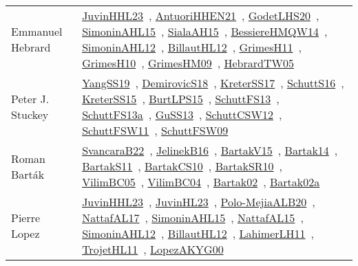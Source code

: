 {\begin{longtable}{p{4cm}p{20cm}}
Emmanuel Hebrard & \href{works/JuvinHHL23.pdf}{JuvinHHL23}~\cite{JuvinHHL23}, \href{works/AntuoriHHEN21.pdf}{AntuoriHHEN21}~\cite{AntuoriHHEN21}, \href{works/GodetLHS20.pdf}{GodetLHS20}~\cite{GodetLHS20}, \href{works/SimoninAHL15.pdf}{SimoninAHL15}~\cite{SimoninAHL15}, \href{works/SialaAH15.pdf}{SialaAH15}~\cite{SialaAH15}, \href{works/BessiereHMQW14.pdf}{BessiereHMQW14}~\cite{BessiereHMQW14}, \href{works/SimoninAHL12.pdf}{SimoninAHL12}~\cite{SimoninAHL12}, \href{works/BillautHL12.pdf}{BillautHL12}~\cite{BillautHL12}, \href{works/GrimesH11.pdf}{GrimesH11}~\cite{GrimesH11}, \href{works/GrimesH10.pdf}{GrimesH10}~\cite{GrimesH10}, \href{works/GrimesHM09.pdf}{GrimesHM09}~\cite{GrimesHM09}, \href{works/HebrardTW05.pdf}{HebrardTW05}~\cite{HebrardTW05}\\
Peter J. Stuckey & \href{works/YangSS19.pdf}{YangSS19}~\cite{YangSS19}, \href{works/DemirovicS18.pdf}{DemirovicS18}~\cite{DemirovicS18}, \href{works/KreterSS17.pdf}{KreterSS17}~\cite{KreterSS17}, \href{works/SchuttS16.pdf}{SchuttS16}~\cite{SchuttS16}, \href{works/KreterSS15.pdf}{KreterSS15}~\cite{KreterSS15}, \href{works/BurtLPS15.pdf}{BurtLPS15}~\cite{BurtLPS15}, \href{works/SchuttFS13.pdf}{SchuttFS13}~\cite{SchuttFS13}, \href{works/SchuttFS13a.pdf}{SchuttFS13a}~\cite{SchuttFS13a}, \href{works/GuSS13.pdf}{GuSS13}~\cite{GuSS13}, \href{works/SchuttCSW12.pdf}{SchuttCSW12}~\cite{SchuttCSW12}, \href{works/SchuttFSW11.pdf}{SchuttFSW11}~\cite{SchuttFSW11}, \href{works/SchuttFSW09.pdf}{SchuttFSW09}~\cite{SchuttFSW09}\\
Roman Bart{\'{a}}k & \href{works/SvancaraB22.pdf}{SvancaraB22}~\cite{SvancaraB22}, \href{works/JelinekB16.pdf}{JelinekB16}~\cite{JelinekB16}, \href{works/BartakV15.pdf}{BartakV15}~\cite{BartakV15}, \href{}{Bartak14}~\cite{Bartak14}, \href{works/BartakS11.pdf}{BartakS11}~\cite{BartakS11}, \href{works/BartakCS10.pdf}{BartakCS10}~\cite{BartakCS10}, \href{works/BartakSR10.pdf}{BartakSR10}~\cite{BartakSR10}, \href{works/VilimBC05.pdf}{VilimBC05}~\cite{VilimBC05}, \href{works/VilimBC04.pdf}{VilimBC04}~\cite{VilimBC04}, \href{works/Bartak02.pdf}{Bartak02}~\cite{Bartak02}, \href{works/Bartak02a.pdf}{Bartak02a}~\cite{Bartak02a}\\
Pierre Lopez & \href{works/JuvinHHL23.pdf}{JuvinHHL23}~\cite{JuvinHHL23}, \href{works/JuvinHL23.pdf}{JuvinHL23}~\cite{JuvinHL23}, \href{works/Polo-MejiaALB20.pdf}{Polo-MejiaALB20}~\cite{Polo-MejiaALB20}, \href{works/NattafAL17.pdf}{NattafAL17}~\cite{NattafAL17}, \href{works/SimoninAHL15.pdf}{SimoninAHL15}~\cite{SimoninAHL15}, \href{works/NattafAL15.pdf}{NattafAL15}~\cite{NattafAL15}, \href{works/SimoninAHL12.pdf}{SimoninAHL12}~\cite{SimoninAHL12}, \href{works/BillautHL12.pdf}{BillautHL12}~\cite{BillautHL12}, \href{works/LahimerLH11.pdf}{LahimerLH11}~\cite{LahimerLH11}, \href{works/TrojetHL11.pdf}{TrojetHL11}~\cite{TrojetHL11}, \href{works/LopezAKYG00.pdf}{LopezAKYG00}~\cite{LopezAKYG00}\\

\end{longtable}}
